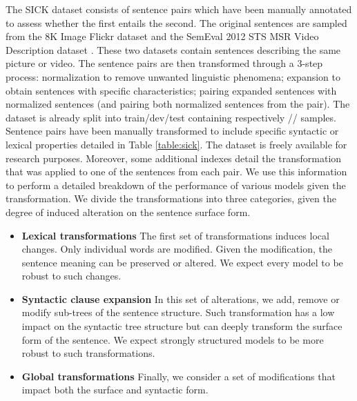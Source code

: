 The SICK dataset \parencite{marelli_14} consists of  sentence pairs which have been manually annotated to assess whether the first entails the second. The original sentences are sampled from the 8K Image Flickr dataset \parencite{dhodosh_13} and the SemEval 2012 STS MSR Video Description dataset \parencite{agirre_12}. These two datasets contain sentences describing the same picture or video. The sentence pairs are then transformed through a 3-step process: normalization to remove unwanted linguistic phenomena; expansion to obtain sentences with specific characteristics; pairing expanded sentences with normalized sentences (and pairing both normalized sentences from the pair).
The dataset is already split into train/dev/test containing respectively // samples. Sentence pairs have been manually transformed to include specific syntactic or lexical properties detailed in Table \ref{table:sick}. The dataset is freely available for research purposes. Moreover, some additional indexes detail the transformation that was applied to one of the sentences from each pair. We use this information to perform a detailed breakdown of the performance of various models given the transformation. We divide the transformations into three categories, given the degree of induced alteration on the sentence surface form.

\begin{itemize}
    \item \textbf{Lexical transformations} The first set of transformations induces local changes. Only individual words are modified. Given the modification, the sentence meaning can be preserved or altered. We expect every model to be robust to such changes. 
    \item \textbf{Syntactic clause expansion} In this set of alterations, we add, remove or modify sub-trees of the sentence structure. Such transformation has a low impact on the syntactic tree structure but can deeply transform the surface form of the sentence. We expect strongly structured models to be more robust to such transformations.
    \item \textbf{Global transformations} Finally, we consider a set of modifications that impact both the surface and syntactic form.
\end{itemize}

